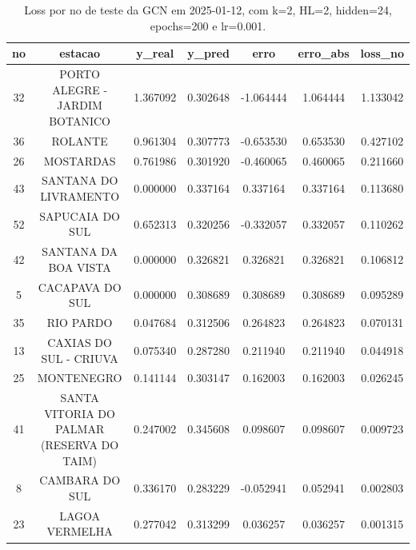\begin{table}[h]
\centering
\caption{Loss por no de teste da GCN em 2025-01-12, com k=2, HL=2, hidden=24, epochs=200 e lr=0.001.}
\label{tab:gcn_loss_k2_hl2_h24_e200_d20250112}
\begin{tabular}{ccccccc}
\toprule
no & estacao & y\_real & y\_pred & erro & erro\_abs & loss\_no \\
\midrule
32 & PORTO ALEGRE - JARDIM BOTANICO & 1.367092 & 0.302648 & -1.064444 & 1.064444 & 1.133042 \\
36 & ROLANTE & 0.961304 & 0.307773 & -0.653530 & 0.653530 & 0.427102 \\
26 & MOSTARDAS & 0.761986 & 0.301920 & -0.460065 & 0.460065 & 0.211660 \\
43 & SANTANA DO LIVRAMENTO & 0.000000 & 0.337164 & 0.337164 & 0.337164 & 0.113680 \\
52 & SAPUCAIA DO SUL & 0.652313 & 0.320256 & -0.332057 & 0.332057 & 0.110262 \\
42 & SANTANA DA BOA VISTA & 0.000000 & 0.326821 & 0.326821 & 0.326821 & 0.106812 \\
5 & CACAPAVA DO SUL & 0.000000 & 0.308689 & 0.308689 & 0.308689 & 0.095289 \\
35 & RIO PARDO & 0.047684 & 0.312506 & 0.264823 & 0.264823 & 0.070131 \\
13 & CAXIAS DO SUL - CRIUVA & 0.075340 & 0.287280 & 0.211940 & 0.211940 & 0.044918 \\
25 & MONTENEGRO & 0.141144 & 0.303147 & 0.162003 & 0.162003 & 0.026245 \\
41 & SANTA VITORIA DO PALMAR (RESERVA DO TAIM) & 0.247002 & 0.345608 & 0.098607 & 0.098607 & 0.009723 \\
8 & CAMBARA DO SUL & 0.336170 & 0.283229 & -0.052941 & 0.052941 & 0.002803 \\
23 & LAGOA VERMELHA & 0.277042 & 0.313299 & 0.036257 & 0.036257 & 0.001315 \\
\bottomrule
\end{tabular}
\end{table}
